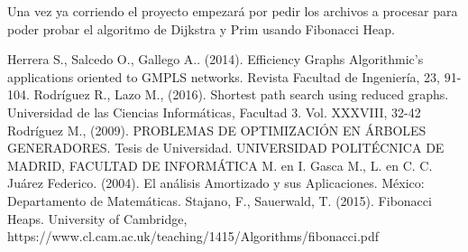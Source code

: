 \documentclass[a4paper, titlepage, 12pt]{article}
\theoremstyle{definition}%
\theoremstyle{Teorema}
\theoremstyle{break}
\begin{document}
Una vez ya corriendo el proyecto empezará por pedir los archivos a procesar para poder probar el algoritmo de Dijkstra y Prim 
usando Fibonacci Heap.

\begin{thebibliography}{99}
   Herrera S., Salcedo O., Gallego A.. (2014). Efficiency Graphs Algorithmic’s applications oriented to GMPLS networks. Revista Facultad de Ingeniería, 23, 91-104.
   Rodríguez R., Lazo M., (2016). Shortest path search using reduced graphs. Universidad de las Ciencias Informáticas, Facultad 3. Vol. XXXVIII, 32-42
   Rodríguez M., (2009). PROBLEMAS DE OPTIMIZACIÓN EN ÁRBOLES GENERADORES. Tesis de Universidad. UNIVERSIDAD POLITÉCNICA DE MADRID, FACULTAD DE INFORMÁTICA
   M. en I. Gasca M., L. en C. C. Juárez Federico. (2004). El análisis Amortizado y sus Aplicaciones. México: Departamento de Matemáticas.
   Stajano, F., Sauerwald, T. (2015). Fibonacci Heaps. University of Cambridge, https://www.cl.cam.ac.uk/teaching/1415/Algorithms/fibonacci.pdf
\end{thebibliography}
\end{document}
